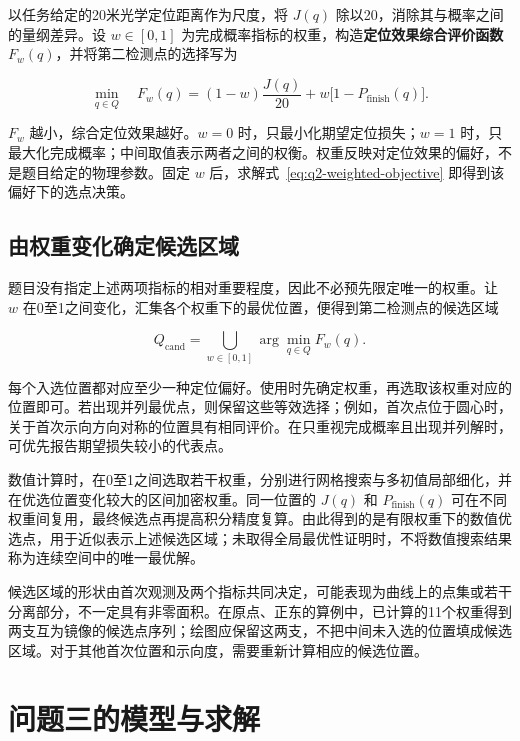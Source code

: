 \documentclass[UTF8,a4paper,zihao=-4,fontset=none]{ctexart}
\begin{document}
以任务给定的20米光学定位距离作为尺度，将 \(J(q)\) 除以20，消除其与概率之间的量纲差异。设 \(w\in[0,1]\) 为完成概率指标的权重，构造\textbf{定位效果综合评价函数} \(F_w(q)\)，并将第二检测点的选择写为

\begin{equation}
 \min_{q\in Q}\quad F_w(q)
 =(1-w)\frac{J(q)}{20}+w\bigl[1-P_{\mathrm{finish}}(q)\bigr].
\label{eq:q2-weighted-objective}
\end{equation}

\(F_w\) 越小，综合定位效果越好。\(w=0\) 时，只最小化期望定位损失；\(w=1\) 时，只最大化完成概率；中间取值表示两者之间的权衡。权重反映对定位效果的偏好，不是题目给定的物理参数。固定 \(w\) 后，求解式~\eqref{eq:q2-weighted-objective} 即得到该偏好下的选点决策。

\subsection{由权重变化确定候选区域}

题目没有指定上述两项指标的相对重要程度，因此不必预先限定唯一的权重。让 \(w\) 在0至1之间变化，汇集各个权重下的最优位置，便得到第二检测点的候选区域

\begin{equation}
 Q_{\mathrm{cand}}=\bigcup_{w\in[0,1]}\arg\min_{q\in Q}F_w(q).
\label{eq:q2-candidate-region}
\end{equation}

每个入选位置都对应至少一种定位偏好。使用时先确定权重，再选取该权重对应的位置即可。若出现并列最优点，则保留这些等效选择；例如，首次点位于圆心时，关于首次示向方向对称的位置具有相同评价。在只重视完成概率且出现并列解时，可优先报告期望损失较小的代表点。

数值计算时，在0至1之间选取若干权重，分别进行网格搜索与多初值局部细化，并在优选位置变化较大的区间加密权重。同一位置的 \(J(q)\) 和 \(P_{\mathrm{finish}}(q)\) 可在不同权重间复用，最终候选点再提高积分精度复算。由此得到的是有限权重下的数值优选点，用于近似表示上述候选区域；未取得全局最优性证明时，不将数值搜索结果称为连续空间中的唯一最优解。

候选区域的形状由首次观测及两个指标共同决定，可能表现为曲线上的点集或若干分离部分，不一定具有非零面积。在原点、正东的算例中，已计算的11个权重得到两支互为镜像的候选点序列；绘图应保留这两支，不把中间未入选的位置填成候选区域。对于其他首次位置和示向度，需要重新计算相应的候选位置。

\section{问题三的模型与求解}
\end{document}

